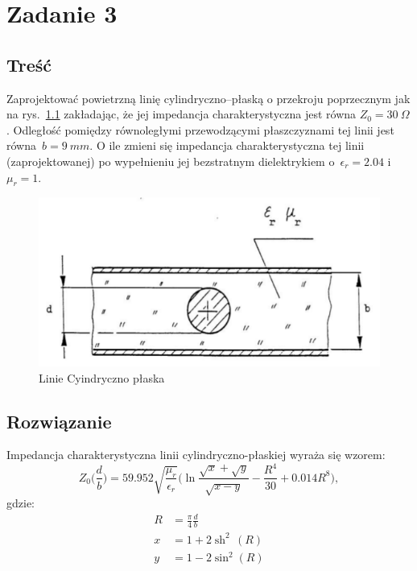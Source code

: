 \documentclass[rep.tex]{subfiles}
\begin{document}
\chapter{Zadanie 3}
\label{zad3}
\section{Treść}
Zaprojektować powietrzną linię cylindryczno–płaską o przekroju poprzecznym jak na rys.~\ref{fig:zad3:line} zakładając,
że jej impedancja charakterystyczna jest równa $Z_0 = 30~\Omega$.
Odległość pomiędzy równoległymi przewodzącymi płaszczyznami tej linii jest równa~$b = 9~mm$.
O ile zmieni się impedancja charakterystyczna tej linii (zaprojektowanej) po wypełnieniu jej
bezstratnym dielektrykiem o~$\epsilon_r = 2.04$ i $\mu_r = 1$.

\begin{figure}[!htbp]
  \centering
  \includegraphics[scale=0.5]{fig/zad3/line}
  \caption{Linie Cyindryczno płaska}
  \label{fig:zad3:line}
\end{figure}

\section{Rozwiązanie}
Impedancja charakterystyczna linii cylindryczno-płaskiej wyraża się wzorem:
\begin{equation}
  Z_0\Big(\frac{d}{b}\Big) = 59.952 \sqrt{\frac{\mu_r}{\epsilon_r}} \Big(\ln{\frac{\sqrt{x} + \sqrt{y}}{\sqrt{x - y}}} - \frac{R^4}{30} + 0.014R^8\Big),
  \label{eqn:zad3:z}
\end{equation}
gdzie:
\begin{align}
  R &= \frac{\pi}{4} \frac{d}{b} \\
  x &= 1 + 2\operatorname{sh}^2\,(R) \\
  y &= 1 - 2\sin^2(R)
\end{align}
\end{document}
